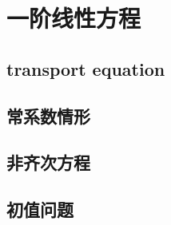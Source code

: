 \section{一阶线性方程}
\label{b2:sec:0701}


\subsection{transport equation}
\label{b2:subsec:070101}

\subsection{常系数情形}
\label{b2:subsec:070102}

\subsection{非齐次方程}
\label{b2:subsec:070103}

\subsection{初值问题}
\label{b2:subsec:070104}



